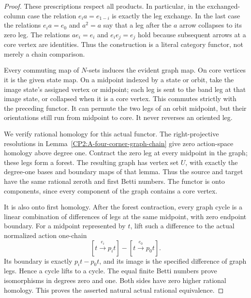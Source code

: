 \begin{proof}
These prescriptions respect all products. In particular,
in the exchanged-column case the relation $e_i a=e_{1-i}$
is exactly the leg exchange. In the last case the relations
$e_i a=e_0$ and $a^2=a$ say that a leg after the $a$ arrow
collapses to its zero leg. The relations $ae_i=e_i$ and
$e_i e_j=e_j$ hold because subsequent arrows at a core
vertex are identities. Thus the construction is a literal
category functor, not merely a chain comparison.

Every commuting map of $N$-sets induces the evident graph
map. On core vertices it is the given state map. On a
midpoint indexed by a state or orbit, take the image state's
assigned vertex or midpoint; each leg is sent to the band
leg at that image state, or collapsed when it is a core
vertex. This commutes strictly with the preceding functor.
It can permute the two legs of an orbit midpoint, but their
orientations still run from midpoint to core. It never
reverses an oriented leg.

We verify rational homology for this actual functor. The
right-projective resolutions in
Lemma~\ref{CP2:A-four-corner-graph-chain} give zero action-space
homology above degree one. Contract the zero leg at every
midpoint in the graph; these legs form a forest. The
resulting graph has vertex set $U$, with exactly the
degree-one bases and boundary maps of that lemma. Thus
the source and target have the same rational zeroth and
first Betti numbers. The functor is onto components, since
every component of the graph contains a core vertex.

It is also onto first homology. After the forest contraction,
every graph cycle is a linear combination of differences
of legs at the same midpoint, with zero endpoint boundary.
For a midpoint represented by $t$, lift such a difference
to the actual normalized action one-chain
\[
 [t\xrightarrow{e_i}p_i t]
       -[t\xrightarrow{e_0}p_0t].                            \tag{2}
\]
Its boundary is exactly $p_it-p_0t$, and its image is the
specified difference of graph legs. Hence a cycle lifts
to a cycle. The equal finite Betti numbers prove isomorphisms
in degrees zero and one. Both sides have zero higher
rational homology. This proves the asserted natural actual
rational equivalence.
\end{proof}

